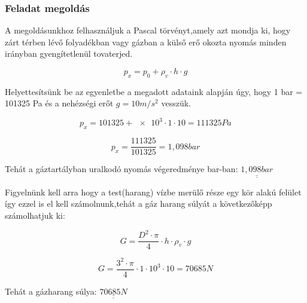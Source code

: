 \begin{figure}[h]
\end{figure}

\noindent\hrulefill
\subsubsection{Feladat megoldás}
\noindent A megoldásunkhoz felhasználjuk a Pascal törvényt,amely azt mondja ki, hogy zárt térben lévő folyadékban vagy gázban a külső erő okozta nyomás minden irányban gyengítetlenül tovaterjed.

\begin{equation}
p_x = p_0+\rho_v\cdot{h}\cdot{g}
\end{equation}

\noindent Helyettesítsünk be az egyenletbe a megadott adataink alapján úgy, hogy 1 bar = 101325 Pa és a nehézségi erőt $g = 10 m/s^2$ vesszük.

\begin{equation}
p_x = 101325+\SI{e3}\cdot{1}\cdot{10} = 111325 Pa 
\end{equation}

\begin{equation}
p_x =\frac{111325}{101325}= 1,098 bar 
\end{equation}

\noindent Tehát a gáztartályban uralkodó nyomás végeredménye bar-ban: $\underline{\underline{1,098 bar}}$

\vspace{0.5cm}

\noindent Figyelnünk kell arra hogy a test(harang) vízbe merülő része egy kör alakú felület így ezzel is el kell számolnunk,tehát a gáz harang súlyát a következőképp számolhatjuk ki:

\begin{equation}
G =\frac{D^2\cdot{\pi}}{4}\cdot{h}\cdot{\rho_v}\cdot{g}
\end{equation}

\begin{equation}
G =\frac{3^2\cdot{\pi}}{4}\cdot{1}\cdot{10^3}\cdot{10} = 70685 N
\end{equation}

\noindent Tehát a gázharang súlya: 
$\underline{\underline{70685 N}}$

